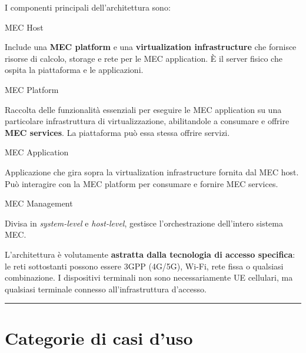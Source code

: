 \documentclass[
  italian,
  openany]{book}
\begin{document}
I componenti principali dell'architettura sono:

\begin{calloutdefinition}{MEC Host}

Include una \textbf{MEC platform} e una \textbf{virtualization
infrastructure} che fornisce risorse di calcolo, storage e rete per le
MEC application. È il server fisico che ospita la piattaforma e le
applicazioni.

\end{calloutdefinition}

\begin{calloutdefinition}{MEC Platform}

Raccolta delle funzionalità essenziali per eseguire le MEC application
su una particolare infrastruttura di virtualizzazione, abilitandole a
consumare e offrire \textbf{MEC services}. La piattaforma può essa
stessa offrire servizi.

\end{calloutdefinition}

\begin{calloutdefinition}{MEC Application}

Applicazione che gira sopra la virtualization infrastructure fornita dal
MEC host. Può interagire con la MEC platform per consumare e fornire MEC
services.

\end{calloutdefinition}

\begin{calloutdefinition}{MEC Management}

Divisa in \emph{system-level} e \emph{host-level}, gestisce
l'orchestrazione dell'intero sistema MEC.

\end{calloutdefinition}

L'architettura è volutamente \textbf{astratta dalla tecnologia di
accesso specifica}: le reti sottostanti possono essere 3GPP (4G/5G),
Wi-Fi, rete fissa o qualsiasi combinazione. I dispositivi terminali non
sono necessariamente UE cellulari, ma qualsiasi terminale connesso
all'infrastruttura d'accesso.

\begin{center}\rule{0.5\linewidth}{0.5pt}\end{center}

\section{Categorie di casi d'uso}\label{categorie-di-casi-duso}
\end{document}
